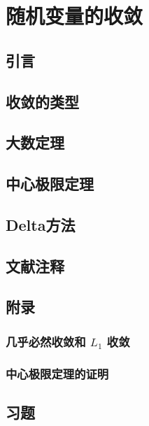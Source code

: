 \chapter{随机变量的收敛}

\section{引言}

\pending

\section{收敛的类型}

\pending

\section{大数定理}

\pending

\section{中心极限定理}

\pending

\section{Delta方法}

\pending

\section{文献注释}

\pending

\section{附录}

\subsection{几乎必然收敛和 $L_1$ 收敛}

\pending


\subsection{中心极限定理的证明}

\pending

\section{习题}

\pending
